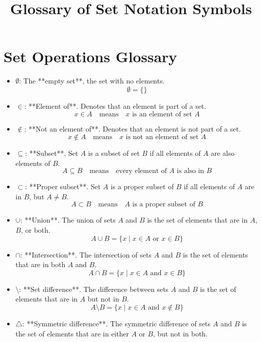 \documentclass{article}
\begin{document}
\title{Glossary of Set Notation Symbols}
\author{}
\date{}
\maketitle

\section{Set Operations Glossary}

\begin{itemize}
    \item \(\emptyset\): The **empty set**, the set with no elements.
    \[
    \emptyset = \{\}
    \]
    \item \(\in\): **Element of**. Denotes that an element is part of a set.
    \[
    x \in A \quad \text{means} \quad x \text{ is an element of set } A
    \]
    \item \(\notin\): **Not an element of**. Denotes that an element is not part of a set.
    \[
    x \notin A \quad \text{means} \quad x \text{ is not an element of set } A
    \]
    \item \(\subseteq\): **Subset**. Set \( A \) is a subset of set \( B \) if all elements of \( A \) are also elements of \( B \).
    \[
    A \subseteq B \quad \text{means} \quad \text{every element of } A \text{ is also in } B
    \]
    \item \(\subset\): **Proper subset**. Set \( A \) is a proper subset of \( B \) if all elements of \( A \) are in \( B \), but \( A \neq B \).
    \[
    A \subset B \quad \text{means} \quad A \text{ is a proper subset of } B
    \]
    \item \(\cup\): **Union**. The union of sets \( A \) and \( B \) is the set of elements that are in \( A \), \( B \), or both.
    \[
    A \cup B = \{x \mid x \in A \text{ or } x \in B\}
    \]
    \item \(\cap\): **Intersection**. The intersection of sets \( A \) and \( B \) is the set of elements that are in both \( A \) and \( B \).
    \[
    A \cap B = \{x \mid x \in A \text{ and } x \in B\}
    \]
    \item \(\setminus\): **Set difference**. The difference between sets \( A \) and \( B \) is the set of elements that are in \( A \) but not in \( B \).
    \[
    A \setminus B = \{x \mid x \in A \text{ and } x \notin B\}
    \]
    \item \(\triangle\): **Symmetric difference**. The symmetric difference of sets \( A \) and \( B \) is the set of elements that are in either \( A \) or \( B \), but not in both.

\end{itemize}
\end{document}
